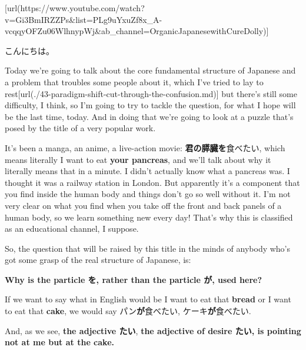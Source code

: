 \startsectionlevel[title={{\bf 88. Xをしたい vs Xがしたい}},reference={xをしたい-vs-xがしたい}]

[url(https://www.youtube.com/watch?v=Gi3BmIRZZPs&list=PLg9uYxuZf8x_A-vcqqyOFZu06WlhnypWj&ab_channel=OrganicJapanesewithCureDolly)]

こんにちは。

Today we're going to talk about the core fundamental structure of Japanese and a problem that troubles some people about it, which I've tried to lay to rest\goto{{[}43{]}}[url(./43-paradigm-shift-cut-through-the-confusion.md)] but there's still some difficulty, I think, so I'm going to try to tackle the question, for what I hope will be the last time, today. And in doing that we're going to look at a puzzle that's posed by the title of a very popular work.

{}

It's been a manga, an anime, a live-action movie: {\bf 君の膵臓を}食べたい, which means literally I want to eat {\bf your pancreas}, and we'll talk about why it literally means that in a minute. I didn't actually know what a pancreas was. I thought it was a railway station in London. But apparently it's a component that you find inside the human body and things don't go so well without it. I'm not very clear on what you find when you take off the front and back panels of a human body, so we learn something new every day! That's why this is classified as an educational channel, I suppose.

So, the question that will be raised by this title in the minds of anybody who's got some grasp of the real structure of Japanese, is:

\startsectionlevel[title={Why is the particle を used instead of the particle が here?},reference={why-is-the-particle-を-used-instead-of-the-particle-が-here}]

{\bf Why is the particle を, rather than the particle が, used here?}

{}

If we want to say what in English would be\crlf
I want to eat that {\bf bread} or I want to eat that {\bf cake}, we would say\crlf
パン{\bf が}食べたい, ケーキ{\bf が}食べたい.

And, as we see, {\bf the adjective たい},\crlf
{\bf the adjective of desire たい, is pointing not at me but at the cake.}

